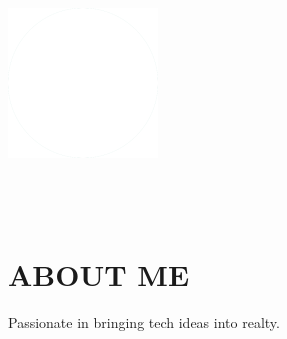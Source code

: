 \documentclass[]{friggeri-cv-theme}
\newcommand{\belowspace}{\vspace*{0.85mm}}
\begin{document}
\begin{aside}
    \includegraphics[scale=0.11]{img/WhiteDots.png}\\~

\end{aside}
~

    
\newcommand{\eduspace}{\vspace*{0.85mm}}
\newcommand{\eduspaceII}{\vspace*{0.8mm}}
\newcommand{\jobspace}{\vspace*{-4.2mm}}
\vspace{-0.5mm}

\section{ABOUT ME}

Passionate in bringing tech ideas into realty.
\end{document}
